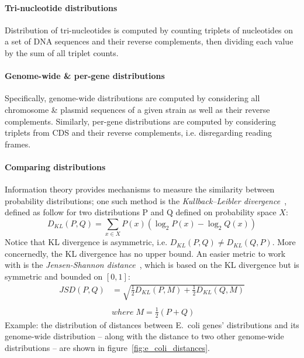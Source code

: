 \documentclass[12pt]{article}
\begin{document}
\paragraph{Tri-nucleotide distributions}
Distribution of tri-nucleotides is computed by counting triplets of nucleotides on a set of DNA sequences and their reverse complements, then dividing each value by the sum of all triplet counts.

\paragraph{Genome-wide \& per-gene distributions}
Specifically, genome-wide distributions are computed by considering all chromosome \& plasmid sequences of a given strain as well as their reverse complements. Similarly, per-gene distributions are computed by considering triplets from CDS and their reverse complements, i.e. disregarding reading frames.

\paragraph{Comparing distributions}
Information theory provides mechanisms to measure the similarity between probability distributions; one such method is the \textit{Kullback–Leibler divergence}~\cite{kullback1951information}, defined as follow for two distributions P and Q defined on probability space $X$:
%
\begin{equation}
D_{KL}(P, Q) = \sum\limits_{x \in X} P(x) (\log_2 P(x) - \log_2 Q(x))
\end{equation}
%
Notice that KL divergence is asymmetric, i.e. $D_{KL}(P, Q) \neq D_{KL}(Q, P)$. More concernedly, the KL divergence has no upper bound. An easier metric to work with is the \textit{Jensen-Shannon distance}~\cite{fuglede2004jensen}, which is based on the KL divergence but is symmetric and bounded on $[0, 1]$:
%
\begin{equation}
\begin{split}
JSD(P, Q) &= \sqrt{\frac{1}{2}D_{KL}(P, M) + \frac{1}{2}D_{KL}(Q, M)} \\
\\
& where \; M = \frac{1}{2}(P + Q)
\end{split}
\end{equation}
%
Example: the distribution of distances between E.~coli genes' distributions and its genome-wide distribution -- along with the distance to two other genome-wide distributions -- are shown in figure~\ref{fig:e_coli_distances}.
\end{document}
